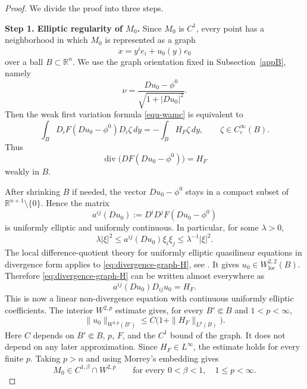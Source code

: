 \documentclass[11pt,reqno]{amsart}
\theoremstyle{definition}
\theoremstyle{remark}
\numberwithin{equation}{section}
\begin{document}
\begin{proof}
We divide the proof into three steps.

\medskip
\noindent
\textbf{Step 1. Elliptic regularity of $M_0$.}
Since $M_0$ is $C^1$, every point has a neighborhood in which $M_0$
is represented as a graph
\begin{equation*}
 x=y^ie_i+u_0(y)e_0
\end{equation*}
over a ball $B\subset\mathbb R^n$. We use the graph orientation fixed in Subsection~\ref{appB}, namely
\begin{equation*}
 \nu=\frac{Du_0-\phi^0}{\sqrt{1+|Du_0|^2}}.
\end{equation*}
Then the weak first variation formula \eqref{equ-wamc} is equivalent to
\begin{equation*}
 \int_B D_iF(Du_0-\phi^0)D_i\zeta\,dy
 =-\int_B H_F\zeta\,dy,
 \qquad \zeta\in C_c^\infty(B).
\end{equation*}
Thus
\begin{equation}
\label{eq:divergence-graph-H}
 \operatorname{div}\big(DF(Du_0-\phi^0)\big)=H_F
\end{equation}
weakly in $B$.

After shrinking $B$ if needed, the vector $Du_0-\phi^0$ stays in a compact subset of
$\mathbb R^{n+1}\setminus\{0\}$. Hence the matrix
\begin{equation*}
 a^{ij}(Du_0):=D^iD^jF(Du_0-\phi^0)
\end{equation*}
is uniformly elliptic and uniformly continuous. In particular, for some $\lambda>0$,
\begin{equation*}
 \lambda |\xi|^2\leq a^{ij}(Du_0)\xi_i\xi_j\leq \lambda^{-1}|\xi|^2.
\end{equation*}
The local difference-quotient theory for uniformly elliptic quasilinear equations in divergence form applies to \eqref{eq:divergence-graph-H}, see \cite[Chapter IV]{LU68}. It gives $u_0\in W_{\mathrm{loc}}^{2,2}(B)$. Therefore \eqref{eq:divergence-graph-H} can be written almost everywhere as
\begin{equation*}
 a^{ij}(Du_0)D_{ij}u_0=H_F.
\end{equation*}
This is now a linear non-divergence equation with continuous uniformly elliptic coefficients. The interior $W^{2,p}$ estimate \cite[Theorem 9.11]{GT01} gives, for every $B'\Subset B$ and $1<p<\infty$,
\begin{equation*}
 \|u_0\|_{W^{2,p}(B')}
 \leq C\bigl(1+\|H_F\|_{L^p(B)}\bigr).
\end{equation*}
Here $C$ depends on $B'\Subset B$, $p$, $F$, and the $C^1$ bound of the graph. It does not depend on any later approximation. Since $H_F\in L^\infty$, the estimate holds for every finite $p$. Taking $p>n$ and using Morrey's embedding gives
\begin{equation}
\label{eq:initial-regularity}
 M_0\in C^{1,\beta}\cap W^{2,p}
 \qquad\text{for every }0<\beta<1,\quad 1\leq p<\infty.
\end{equation}


\end{proof}
\end{document}
